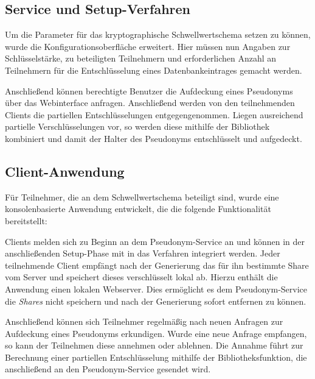\subsection{Service und Setup-Verfahren}


Um die Parameter für das kryptographische Schwellwertschema setzen zu können, wurde die Konfigurationsoberfläche erweitert. Hier müssen nun Angaben zur Schlüsselstärke, zu beteiligten Teilnehmern und erforderlichen Anzahl an Teilnehmern für die Entschlüsselung eines Datenbankeintrages gemacht werden.

Anschließend können berechtigte Benutzer die Aufdeckung eines Pseudonyms über das Webinterface anfragen. Anschließend werden von den teilnehmenden Clients die partiellen Entschlüsselungen entgegengenommen. Liegen ausreichend partielle Verschlüsselungen vor, so werden diese mithilfe der Bibliothek kombiniert und damit der Halter des Pseudonyms entschlüsselt und aufgedeckt. 

\subsection{Client-Anwendung}

%

Für Teilnehmer, die an dem Schwellwertschema beteiligt sind, wurde eine konsolenbasierte Anwendung entwickelt, die die folgende Funktionalität bereitstellt:

Clients melden sich zu Beginn an dem Pseudonym-Service an und können in der anschließenden Setup-Phase mit in das Verfahren integriert werden. Jeder teilnehmende Client empfängt nach der Generierung das für ihn bestimmte Share vom Server und speichert dieses verschlüsselt lokal ab. Hierzu enthält die Anwendung einen lokalen Webserver. Dies ermöglicht es dem Pseudonym-Service die \textit{Shares} nicht speichern und nach der Generierung sofort entfernen zu können. 

Anschließend können sich Teilnehmer regelmäßig nach neuen Anfragen zur Aufdeckung eines Pseudonyms erkundigen. Wurde eine neue Anfrage empfangen, so kann der Teilnehmen diese annehmen oder ablehnen. Die Annahme führt zur Berechnung einer partiellen Entschlüsselung mithilfe der Bibliotheksfunktion, die anschließend an den Pseudonym-Service gesendet wird.


